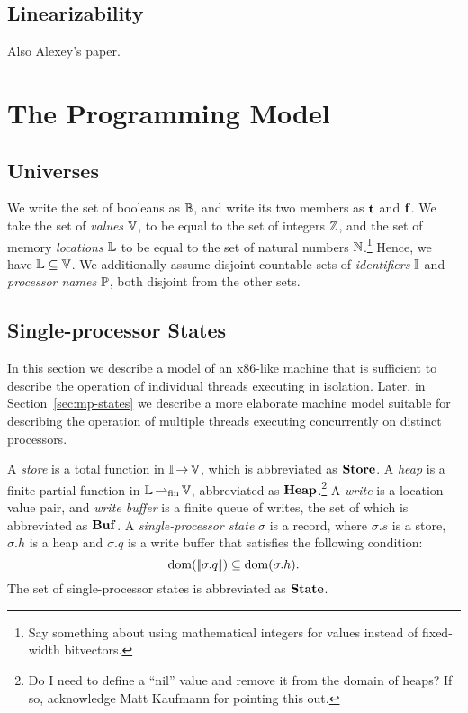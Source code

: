 \documentclass[11pt]{report}
\begin{document}

\section{Linearizability} %
\label{sec:linearizability}

\cite{DBLP:journals/toplas/HerlihyW90} Also Alexey's paper.


\chapter{The Programming Model}

\section{Universes} %
\label{sec:universes}


We write the set of booleans as $\mathbb{B}$, and write its two members as $\mathbf{t}$ and $\mathbf{f}$. We take the set of \emph{values} $\mathbb{V}$, to be equal to the set of integers $\mathbb{Z}$, and the set of memory \emph{locations} $\mathbb{L}$ to be equal to the set of natural numbers $\mathbb{N}$.\footnote{Say something about using mathematical integers for values instead of fixed-width bitvectors.} Hence, we have $\mathbb{L} \subseteq \mathbb{V}$. We additionally assume disjoint countable sets of \emph{identifiers} $\mathbb{I}$ and \emph{processor names} $\mathbb{P}$, both disjoint from the other sets. 

\section{Single-processor States} %
\label{sec:sp-states}

In this section we describe a model of an x86-like machine that is sufficient to describe the operation of individual threads executing in isolation. Later, in Section~\ref{sec:mp-states} we describe a more elaborate machine model suitable for describing the operation of multiple threads executing concurrently on distinct processors.

A \emph{store} is a total function in $\mathbb{I} \operatorname{\rightarrow} \mathbb{V}$, which is abbreviated as $\mathbf{Store}$. A \emph{heap} is a finite partial function in $\mathbb{L} \operatorname{\operatorname{\rightharpoonup}_{\mathrm{fin}}} \mathbb{V}$, abbreviated as $\mathbf{Heap}$.\footnote{Do I need to define a ``nil'' value and remove it from the domain of heaps? If so, acknowledge Matt Kaufmann for pointing this out.} A \emph{write} is a location-value pair, and \emph{write buffer} is a finite queue of writes, the set of which is abbreviated as $\mathbf{Buf}$. %
A \emph{single-processor state} $\sigma$ is a record, where $\sigma.s$ is a store, $\sigma.h$ is a heap and $\sigma.q$ is a write buffer that satisfies the following condition: \[ \operatorname{\mathrm{dom}}(|\!|\sigma.q|\!|) \subseteq \operatorname{\mathrm{dom}}(\sigma.h).\] The set of single-processor states is abbreviated as $\mathbf{State}$. 
\end{document}
